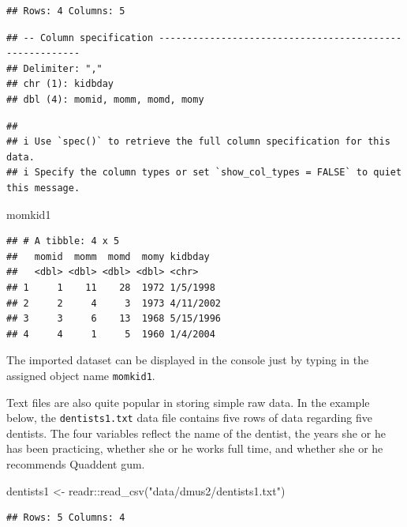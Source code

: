 \documentclass[
]{book}
\newenvironment{Shaded}{\begin{snugshade}}{\end{snugshade}}
\newcommand{\FunctionTok}[1]{\textcolor[rgb]{0.00,0.00,0.00}{#1}}
\newcommand{\NormalTok}[1]{#1}
\newcommand{\OtherTok}[1]{\textcolor[rgb]{0.56,0.35,0.01}{#1}}
\newcommand{\SpecialCharTok}[1]{\textcolor[rgb]{0.00,0.00,0.00}{#1}}
\newcommand{\StringTok}[1]{\textcolor[rgb]{0.31,0.60,0.02}{#1}}
\begin{document}
\begin{verbatim}
## Rows: 4 Columns: 5
\end{verbatim}

\begin{verbatim}
## -- Column specification --------------------------------------------------------
## Delimiter: ","
## chr (1): kidbday
## dbl (4): momid, momm, momd, momy
\end{verbatim}

\begin{verbatim}
## 
## i Use `spec()` to retrieve the full column specification for this data.
## i Specify the column types or set `show_col_types = FALSE` to quiet this message.
\end{verbatim}

\begin{Shaded}
\begin{Highlighting}[]
\NormalTok{momkid1}
\end{Highlighting}
\end{Shaded}

\begin{verbatim}
## # A tibble: 4 x 5
##   momid  momm  momd  momy kidbday  
##   <dbl> <dbl> <dbl> <dbl> <chr>    
## 1     1    11    28  1972 1/5/1998 
## 2     2     4     3  1973 4/11/2002
## 3     3     6    13  1968 5/15/1996
## 4     4     1     5  1960 1/4/2004
\end{verbatim}

The imported dataset can be displayed in the console just by typing in the assigned object name \texttt{momkid1}.

Text files are also quite popular in storing simple raw data. In the example below, the \texttt{dentists1.txt} data file contains five rows of data regarding five dentists. The four variables reflect the name of the dentist, the years she or he has been practicing, whether she or he works full time, and whether she or he recommends Quaddent gum.

\begin{Shaded}
\begin{Highlighting}[]
\NormalTok{dentists1 }\OtherTok{\textless{}{-}}\NormalTok{ readr}\SpecialCharTok{::}\FunctionTok{read\_csv}\NormalTok{(}\StringTok{"data/dmus2/dentists1.txt"}\NormalTok{)}
\end{Highlighting}
\end{Shaded}

\begin{verbatim}
## Rows: 5 Columns: 4
\end{verbatim}
\end{document}
